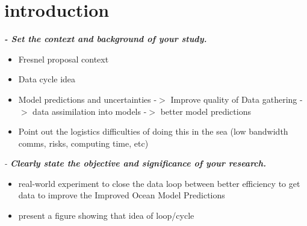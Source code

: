\section{introduction}

\textit{\textbf{-	Set the context and background of your study.}}
\begin{itemize}
\item Fresnel proposal context
\item Data cycle idea
\item Model predictions and uncertainties -$>$ Improve quality of Data gathering -$>$ data assimilation into models -$>$ better model predictions
\item Point out the logistics difficulties of doing this in the sea (low bandwidth comms, risks, computing time, etc)
\end{itemize}

\textit{-	\textbf{Clearly state the objective and significance of your research.}}
\begin{itemize}
\item real-world experiment to close the data loop between better efficiency to get data to improve the Improved Ocean Model Predictions\
\end{itemize}
\begin{itemize}
    \item present a figure showing that idea of loop/cycle
\end{itemize}
